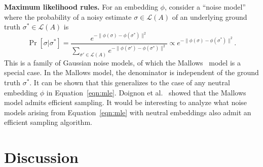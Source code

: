 \documentclass[prodmode]{acmsmall-ec14}
\newcommand{\calL}{{\mathcal{L}}}
\newcommand{\rank}{{\calL(A)}}
\begin{document}

\medskip
\noindent \textbf{Maximum likelihood rules.} For an embedding $\phi$, consider a ``noise model'' where the probability of a noisy estimate $\sigma \in \rank$ of an underlying ground truth $\sigma^* \in \rank$ is 
\begin{equation}
\Pr[\sigma | \sigma^*] = \frac{e^{-\|\phi(\sigma)-\phi(\sigma^*)\|^2}}{\sum_{\sigma' \in \rank} e^{-\|\phi(\sigma')-\phi(\sigma^*)\|^2}} \propto e^{-\|\phi(\sigma)-\phi(\sigma^*)\|^2}.
\label{eqn:mle}
\end{equation}
%
This is a family of Gaussian noise models, of which the Mallows~ model is a special case. In the Mallows model, the denominator is independent of the ground truth $\sigma^*$. It can be shown that this generalizes to the case of any neutral embedding $\phi$ in Equation~\eqref{eqn:mle}. Doignon et al.~ showed that the Mallows model admits efficient sampling. It would be interesting to analyze what noise models arising from Equation~\eqref{eqn:mle} with neutral embeddings also admit an efficient sampling algorithm. 


\section{Discussion}
\label{sec:disc}
\end{document}
